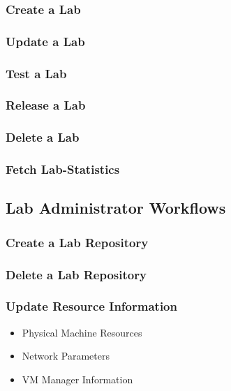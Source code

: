 \documentclass[11pt]{article}
\begin{document}
\subsubsection{Create a Lab}
\label{sec-3.1.1}

\subsubsection{Update a Lab}
\label{sec-3.1.2}

\subsubsection{Test a Lab}
\label{sec-3.1.3}

\subsubsection{Release a Lab}
\label{sec-3.1.4}

\subsubsection{Delete a Lab}
\label{sec-3.1.5}

\subsubsection{Fetch Lab-Statistics}
\label{sec-3.1.6}

\subsection{Lab Administrator Workflows}
\label{sec-3.2}

\subsubsection{Create a Lab Repository}
\label{sec-3.2.1}

\subsubsection{Delete a Lab Repository}
\label{sec-3.2.2}

\subsubsection{Update Resource Information}
\label{sec-3.2.3}

\begin{itemize}
\item Physical Machine Resources
\item Network Parameters
\item VM Manager Information
\end{itemize}
\end{document}
